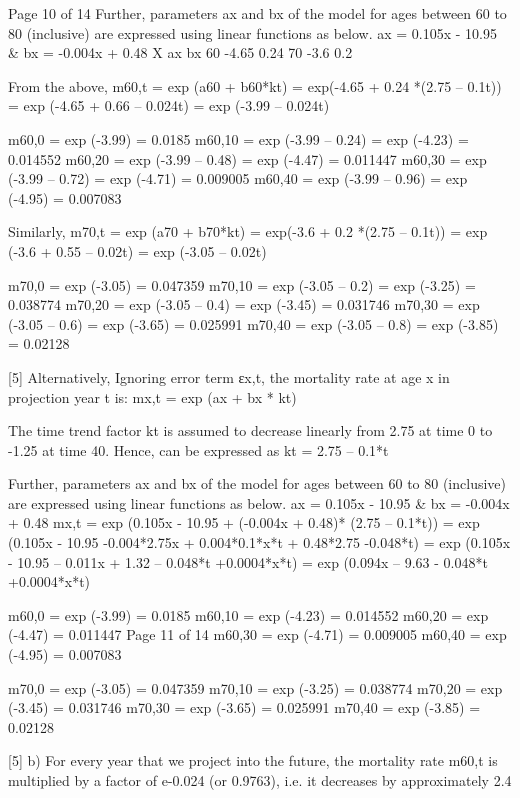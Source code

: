 \documentclass[a4paper,12pt]{article}
\begin{document}
Page 10 of 14
Further, parameters ax and bx of the model for ages between 60 to 80 (inclusive) are expressed using linear functions as below.
ax = 0.105x - 10.95 &
bx = -0.004x + 0.48
X
ax
bx
60
-4.65
0.24
70
-3.6
0.2

From the above,
m60,t = exp (a60 + b60*kt)
= exp(-4.65 + 0.24 *(2.75 – 0.1t))
= exp (-4.65 + 0.66 – 0.024t)
= exp (-3.99 – 0.024t)

m60,0 = exp (-3.99) = 0.0185
m60,10 = exp (-3.99 – 0.24) = exp (-4.23) = 0.014552
m60,20 = exp (-3.99 – 0.48) = exp (-4.47) = 0.011447
m60,30 = exp (-3.99 – 0.72) = exp (-4.71) = 0.009005
m60,40 = exp (-3.99 – 0.96) = exp (-4.95) = 0.007083

Similarly,
m70,t = exp (a70 + b70*kt)
= exp(-3.6 + 0.2 *(2.75 – 0.1t))
= exp (-3.6 + 0.55 – 0.02t)
= exp (-3.05 – 0.02t)

m70,0 = exp (-3.05) = 0.047359
m70,10 = exp (-3.05 – 0.2) = exp (-3.25) = 0.038774
m70,20 = exp (-3.05 – 0.4) = exp (-3.45) = 0.031746
m70,30 = exp (-3.05 – 0.6) = exp (-3.65) = 0.025991
m70,40 = exp (-3.05 – 0.8) = exp (-3.85) = 0.02128

[5]
Alternatively,
Ignoring error term εx,t, the mortality rate at age x in projection year t is:
mx,t = exp (ax + bx * kt)

The time trend factor kt is assumed to decrease linearly from 2.75 at time 0 to -1.25 at time 40. Hence, can be expressed as
kt = 2.75 – 0.1*t

Further, parameters ax and bx of the model for ages between 60 to 80 (inclusive) are expressed using linear functions as below.
ax = 0.105x - 10.95 &
bx = -0.004x + 0.48
mx,t = exp (0.105x - 10.95 + (-0.004x + 0.48)* (2.75 – 0.1*t))
= exp (0.105x - 10.95 -0.004*2.75x + 0.004*0.1*x*t + 0.48*2.75 -0.048*t)
= exp (0.105x - 10.95 – 0.011x + 1.32 – 0.048*t +0.0004*x*t)
= exp (0.094x – 9.63 - 0.048*t +0.0004*x*t)

m60,0 = exp (-3.99) = 0.0185
m60,10 = exp (-4.23) = 0.014552
m60,20 = exp (-4.47) = 0.011447
Page 11 of 14
m60,30 = exp (-4.71) = 0.009005
m60,40 = exp (-4.95) = 0.007083

m70,0 = exp (-3.05) = 0.047359
m70,10 = exp (-3.25) = 0.038774
m70,20 = exp (-3.45) = 0.031746
m70,30 = exp (-3.65) = 0.025991
m70,40 = exp (-3.85) = 0.02128

[5]
b) For every year that we project into the future, the mortality rate m60,t is multiplied by a factor of e-0.024 (or 0.9763), i.e. it decreases by approximately 2.4%
\end{document}
